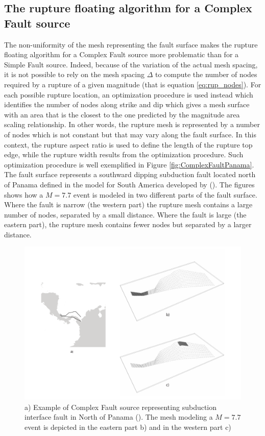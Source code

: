 \subsection{The rupture floating algorithm for a Complex Fault source}
The non-uniformity of the mesh representing the fault surface makes the rupture floating algorithm for a Complex
Fault source more problematic than for a Simple Fault source. Indeed, because of the variation of the actual mesh spacing, it is not possible to rely on the mesh spacing $\Delta$ to compute the number of nodes required by a rupture of a given magnitude (that is equation \ref{eq:rup_nodes}). For each possible rupture location, an optimization
procedure is used instead which identifies the number of nodes along strike and dip which gives a mesh surface with an area that is the closest to the one predicted by the magnitude area scaling relationship. In other words, the rupture mesh is represented by a number of nodes which is not constant but that may vary along the fault surface. In this context, the rupture aspect ratio is used to define the length of the rupture top edge, while the rupture width results from the optimization procedure. Such optimization procedure is well exemplified in Figure \ref{fig:ComplexFaultPanama}. The fault surface represents a southward dipping subduction fault located north of Panama defined
in the model for South America developed by (\cite{petersen2010}). The figures shows how a $M=7.7$ event is modeled in two different parts of the fault surface. Where the fault is narrow (the western part) the rupture mesh
contains a large number of nodes, separated by a small distance. Where the fault is large (the eastern part), the
rupture mesh contains fewer nodes but separated by a larger distance.
\begin{figure}
\centering
\includegraphics[width=14cm]{./Pictures/ComplexFaultPanama.pdf}
\caption{a) Example of Complex Fault source representing subduction interface fault in North of Panama (\cite{petersen2010}). The mesh modeling a $M=7.7$ event is depicted in the eastern part b) and in the western part c)}
\label{fig:ComplexFaultSourcePanama}
\end{figure}

